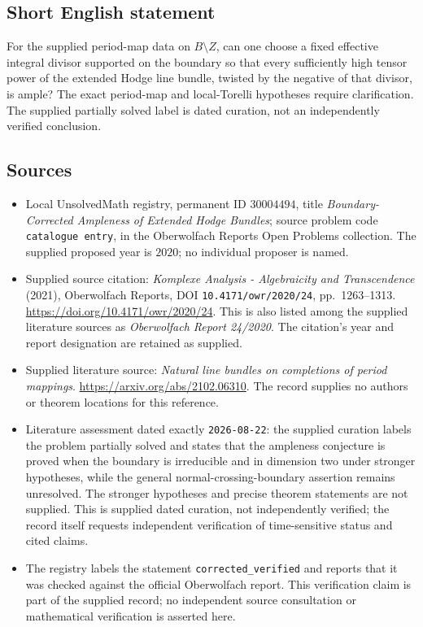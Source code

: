 \documentclass[11pt]{article}
\begin{document}
\subsection{Short English statement}
For the supplied period-map data on \(B\setminus Z\), can one choose a fixed effective integral divisor supported on the boundary so that every sufficiently high tensor power of the extended Hodge line bundle, twisted by the negative of that divisor, is ample? The exact period-map and local-Torelli hypotheses require clarification. The supplied partially solved label is dated curation, not an independently verified conclusion.
\subsection{Sources}
\begin{itemize}
\item Local UnsolvedMath registry, permanent ID \(30004494\), title \emph{Boundary-Corrected Ampleness of Extended Hodge Bundles}; source problem code \texttt{catalogue entry}, in the Oberwolfach Reports Open Problems collection. The supplied proposed year is \(2020\); no individual proposer is named.
\item Supplied source citation: \emph{Komplexe Analysis - Algebraicity and Transcendence} (2021), Oberwolfach Reports, DOI \texttt{10.4171/owr/2020/24}, pp.\ 1263--1313. \url{https://doi.org/10.4171/owr/2020/24}. This is also listed among the supplied literature sources as \emph{Oberwolfach Report 24/2020}. The citation's year and report designation are retained as supplied.
\item Supplied literature source: \emph{Natural line bundles on completions of period mappings}. \url{https://arxiv.org/abs/2102.06310}. The record supplies no authors or theorem locations for this reference.
\item Literature assessment dated exactly \texttt{2026-08-22}: the supplied curation labels the problem partially solved and states that the ampleness conjecture is proved when the boundary is irreducible and in dimension two under stronger hypotheses, while the general normal-crossing-boundary assertion remains unresolved. The stronger hypotheses and precise theorem statements are not supplied. This is supplied dated curation, not independently verified; the record itself requests independent verification of time-sensitive status and cited claims.
\item The registry labels the statement \texttt{corrected\_verified} and reports that it was checked against the official Oberwolfach report. This verification claim is part of the supplied record; no independent source consultation or mathematical verification is asserted here.
\end{itemize}
\end{document}
